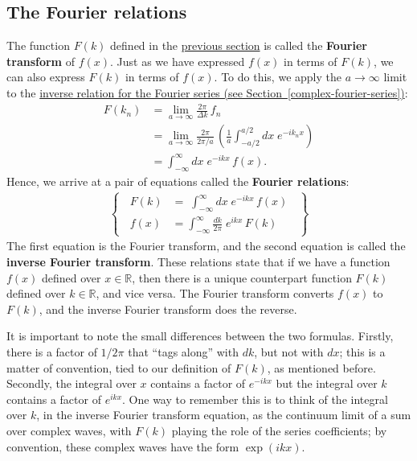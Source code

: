 \documentclass[10pt,a4paper]{article}
\begin{document}
\subsection{The Fourier relations}
\label{fourier-relations}

The function $F(k)$ defined in the
\hyperref[fourier-transforms]{previous section} is called the
\textbf{Fourier transform} of $f(x)$. Just as we have expressed $f(x)$
in terms of $F(k)$, we can also express $F(k)$ in terms of $f(x)$. To
do this, we apply the $a \rightarrow \infty$ limit to the
\hyperref[complex-fourier-series]{inverse relation for the Fourier
  series (see Section~\ref{complex-fourier-series})}:
\begin{align}
  F(k_n) &= \lim_{a\rightarrow \infty} \frac{2 \pi}{\Delta k}\, f_n \\
  &= \lim_{a\rightarrow \infty} \frac{2 \pi}{2\pi/a}\, \left(\frac{1}{a}
  \int_{-a/2}^{a/2} dx\; e^{-i k_n x}\right) \\
  &= \int_{-\infty}^\infty dx\; e^{-i kx}\, f(x).
\end{align}
Hence, we arrive at a pair of equations called the \textbf{Fourier
  relations}:
\begin{align}
  \left\{\;\;\begin{aligned}F(k) &= \;\int_{-\infty}^\infty dx\; e^{-ikx}\, f(x) \\
  f(x) &= \int_{-\infty}^\infty \frac{dk}{2\pi}\; e^{ikx}\, F(k)\end{aligned}\;\;\right\}
\end{align}
The first equation is the Fourier transform, and the second equation
is called the \textbf{inverse Fourier transform}. These relations
state that if we have a function $f(x)$ defined over $x \in
\mathbb{R}$, then there is a unique counterpart function $F(k)$
defined over $k \in \mathbb{R}$, and vice versa. The Fourier transform
converts $f(x)$ to $F(k)$, and the inverse Fourier transform does the
reverse.

It is important to note the small differences between the two
formulas.  Firstly, there is a factor of $1/2\pi$ that ``tags along''
with $dk$, but not with $dx$; this is a matter of convention, tied to
our definition of $F(k)$, as mentioned before. Secondly, the integral
over $x$ contains a factor of $e^{-ikx}$ but the integral over $k$
contains a factor of $e^{ikx}$. One way to remember this is to think
of the integral over $k$, in the inverse Fourier transform equation,
as the continuum limit of a sum over complex waves, with $F(k)$
playing the role of the series coefficients; by convention, these
complex waves have the form $\exp(ikx)$.
\end{document}
